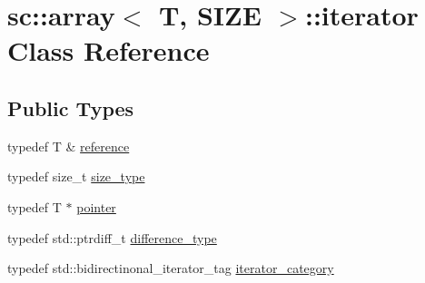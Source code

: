 \hypertarget{classsc_1_1array_1_1iterator}{}\section{sc\+:\+:array$<$ T, S\+I\+ZE $>$\+:\+:iterator Class Reference}
\label{classsc_1_1array_1_1iterator}
\subsection*{Public Types}
\begin{DoxyCompactItemize}
\item 
typedef T \& \hyperlink{classsc_1_1array_1_1iterator_a8015b13eb5e649591e3b0265546a0201}{reference}
\item 
typedef size\+\_\+t \hyperlink{classsc_1_1array_1_1iterator_aeec0cf52de962a18d79cdbcdfe74be92}{size\+\_\+type}
\item 
typedef T $\ast$ \hyperlink{classsc_1_1array_1_1iterator_a1b59529d09bbd80445a8d931b102dbe0}{pointer}
\item 
typedef std\+::ptrdiff\+\_\+t \hyperlink{classsc_1_1array_1_1iterator_aee2e53646f6728620da44512ec0ea2d1}{difference\+\_\+type}
\item 
typedef std\+::bidirectinonal\+\_\+iterator\+\_\+tag \hyperlink{classsc_1_1array_1_1iterator_a75eb4a75d259d12310f3be4d16e8a7b9}{iterator\+\_\+category}
\end{DoxyCompactItemize}
